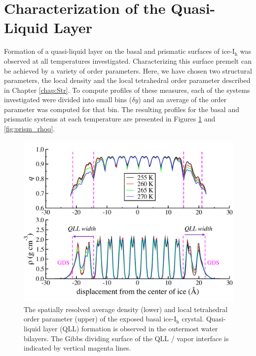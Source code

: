 \section{Characterization of the Quasi-Liquid Layer}
Formation of a quasi-liquid layer on the basal and prismatic surfaces
of ice-I$_\mathrm{h}$ was observed at all temperatures
investigated. Characterizing this surface premelt can be achieved by a
variety of order parameters. Here, we have chosen two structural
parameters, the local density and the local tetrahedral order
parameter described in Chapter \ref{chap:Str}. To compute profiles of
these measures, each of the systems investigated were divided into
small bins ($\delta y$) and an average of the order parameter was
computed for that bin. The resulting profiles for the basal and
prismatic systems at each temperature are presented in Figures
\ref{fig:basal_rhoq} and \ref{fig:prism_rhoq}.

\begin{figure}
\includegraphics[width=\linewidth]{Figures/basal_qdens}
\caption{\label{fig:basal_rhoq} The spatially resolved average density
  (lower) and local tetrahedral order parameter (upper) of the
  exposed basal ice-I$_\mathrm{h}$ crystal. Quasi-liquid layer (QLL)
  formation is observed in the outermost water bilayers. The Gibbs
  dividing surface of the QLL / vapor interface is indicated by
  vertical magenta lines. }
\end{figure}                


